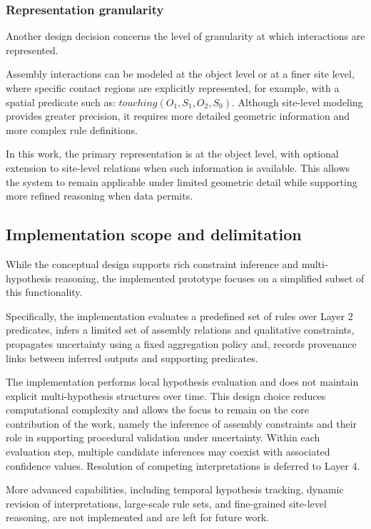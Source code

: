 \documentclass[11pt,titlepage,openright]{book}
\begin{document}
\subsubsection{Representation granularity}

Another design decision concerns the level of granularity at which interactions are represented.

Assembly interactions can be modeled at the object level or at a finer site level, where specific contact regions are explicitly represented, for example, with a spatial predicate such as: $touching(O_1,S_1,O_2,S_0)$. Although site-level modeling provides greater precision, it requires more detailed geometric information and more complex rule definitions.

In this work, the primary representation is at the object level, with optional extension to site-level relations when such information is available. This allows the system to remain applicable under limited geometric detail while supporting more refined reasoning when data permits.

\subsection{Implementation scope and delimitation}

While the conceptual design supports rich constraint inference and multi-hypothesis reasoning, the implemented prototype focuses on a simplified subset of this functionality.

Specifically, the implementation evaluates a predefined set of rules over Layer 2 predicates, infers a limited set of assembly relations and qualitative constraints, propagates uncertainty using a fixed aggregation policy and, records provenance links between inferred outputs and supporting predicates.

The implementation performs local hypothesis evaluation and does not maintain explicit multi-hypothesis structures over time. This design choice reduces computational complexity and allows the focus to remain on the core contribution of the work, namely the inference of assembly constraints and their role in supporting procedural validation under uncertainty. Within each evaluation step, multiple candidate inferences may coexist with associated confidence values. Resolution of competing interpretations is deferred to Layer 4.

More advanced capabilities, including temporal hypothesis tracking, dynamic revision of interpretations, large-scale rule sets, and fine-grained site-level reasoning, are not implemented and are left for future work.
\end{document}
